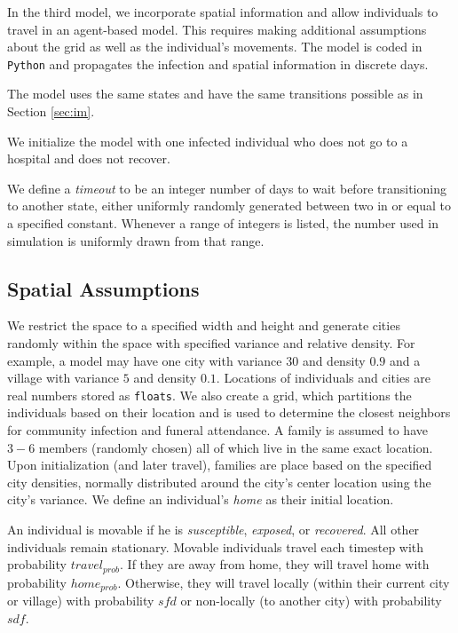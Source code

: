 In the third model, we incorporate spatial information and allow individuals to travel in an agent-based model. This requires making additional assumptions about the grid as well as the individual's movements. The model is coded in \texttt{Python} and propagates the infection and spatial information in discrete days. 

The model uses the same states and have the same transitions possible as in Section \ref{sec:im}.

We initialize the model with one infected individual who does not go to a hospital and does not recover. 

We define a \emph{timeout} to be an integer number of days to wait before transitioning to another state, either uniformly randomly generated between two in or equal to a specified constant. Whenever a range of integers is listed, the number used in simulation is uniformly drawn from that range.

\subsection{Spatial Assumptions}
We restrict the space to a specified width and height and generate cities randomly within the space with specified variance and relative density. For example, a model may have one city with variance $30$ and density $0.9$ and a village with variance $5$ and density $0.1$. Locations of individuals and cities are real numbers stored as \texttt{floats}. We also create a grid, which partitions the individuals based on their location and is used to determine the closest neighbors for community infection and funeral attendance. A family is assumed to have $3-6$ members (randomly chosen) all of which live in the same exact location. Upon initialization (and later travel), families are place based on the specified city densities, normally distributed around the city's center location using the city's variance. We define an individual's \emph{home} as their initial location.

An individual is movable if he is \emph{susceptible}, \emph{exposed}, or \emph{recovered}. All other individuals remain stationary. Movable individuals travel each timestep with probability $travel_{prob}$. If they are away from home, they will travel home with probability $home_{prob}$. Otherwise, they will travel locally (within their current city or village) with probability $sfd$ or non-locally (to another city) with probability $sdf$.

